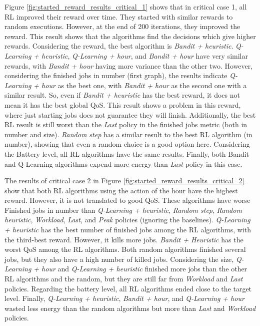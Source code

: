 Figure \ref{fig:started_reward_results_critical_1} shows that in critical case 1, all RL improved their reward over time. They started with similar rewards to random executions. However, at the end of 200 iterations, they improved the reward. This result shows that the algorithms find the decisions which give higher rewards. Considering the reward, the best algorithm is \emph{Bandit + heuristic}. \emph{Q-Learning + heuristic}, \emph{Q-Learning + hour}, and \emph{Bandit + hour} have very similar rewards, with \emph{Bandit + hour} having more variance than the other two. However, considering the finished jobs in number (first graph), the results indicate \emph{Q-Learning + hour} as the best one, with \emph{Bandit + hour} as the second one with a similar result. So, even if \emph{Bandit + heuristic} has the best reward, it does not mean it has the best global QoS. This result shows a problem in this reward, where just starting jobs does not guarantee they will finish. Additionally, the best RL result is still worst than the \emph{Last} policy in the finished jobs metric (both in number and size). \emph{Random step} has a similar result to the best RL algorithm (in number), showing that even a random choice is a good option here. Considering the Battery level, all RL algorithms have the same results. Finally, both Bandit and Q-Learning algorithms expend more energy than \emph{Last} policy in this case.

The results of critical case 2 in Figure \ref{fig:started_reward_results_critical_2} show that both RL algorithms using the action of the hour have the highest reward. However, it is not translated to good QoS. These algorithms have worse Finished jobs in number than \emph{Q-Learning + heuristic}, \emph{Random step}, \emph{Random heuristic}, \emph{Workload}, \emph{Last}, and \emph{Peak} policies (ignoring the baselines). \emph{Q-Learning + heuristic} has the best number of finished jobs among the RL algorithms, with the third-best reward. However, it kills more jobs. \emph{Bandit + Heuristic} has the worst QoS among the RL algorithms. Both random algorithms finished several jobs, but they also have a high number of killed jobs. Considering the size, \emph{Q-Learning + hour} and \emph{Q-Learning + heuristic} finished more jobs than the other RL algorithms and the random, but they are still far from \emph{Workload} and \emph{Last} policies. Regarding the battery level, all RL algorithms ended close to the target level. Finally, \emph{Q-Learning + heuristic}, \emph{Bandit + hour}, and \emph{Q-Learning + hour} wasted less energy than the random algorithms but more than \emph{Last} and \emph{Workload} policies.

